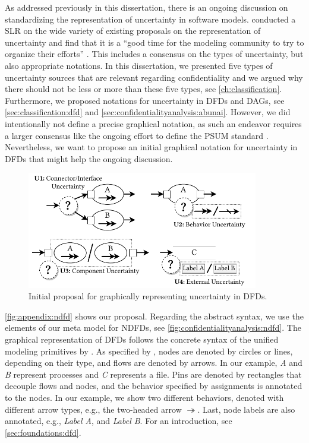 As addressed previously in this dissertation, there is an ongoing discussion on standardizing the representation of uncertainty in software models.
\textcite{troya_uncertainty_2021} conducted a \acf{SLR} on the wide variety of existing proposals on the representation of uncertainty and find that it is a \enquote{good time for the modeling community to try to organize their efforts} \cite{troya_uncertainty_2021}.
This includes a consensus on the types of uncertainty, but also appropriate notations.
In this dissertation, we presented five types of uncertainty sources that are relevant regarding confidentiality and we argued why there should not be less or more than these five types, see \autoref{ch:classification}.
Furthermore, we proposed notations for uncertainty in \acfp{DFD} and \acfp{DAG}, see \autoref{sec:classification:dfd} and \autoref{sec:confidentialityanalysis:abunai}.
However, we did intentionally not define a precise graphical notation, as such an endeavor requires a larger consensus like the ongoing effort to define the \acf{PSUM} standard \cite{PSUM}.
Nevertheless, we want to propose an initial graphical notation for uncertainty in \acp{DFD} that might help the ongoing discussion.

\begin{figure}
    \centering
    \includegraphics[width=0.9\textwidth]{figures/chapter12/graphicalndfd.pdf}
    \caption{Initial proposal for graphically representing uncertainty in \acfp*{DFD}.}
    \label{fig:appendix:ndfd}
\end{figure}

\autoref{fig:appendix:ndfd} shows our proposal.
Regarding the abstract syntax, we use the elements of our meta model for \acfp{NDFD}, see \autoref{fig:confidentialityanalysis:ndfd}.
The graphical representation of \acp{DFD} follows the concrete syntax of the unified modeling primitives by \textcite{seifermann_unified_2021}.
As specified by \textcite{demarco_structure_1979}, nodes are denoted by circles or lines, depending on their type, and flows are denoted by arrows.
In our example, \emph{A} and \emph{B} represent processes and \emph{C} represents a file.
Pins are denoted by rectangles that decouple flows and nodes, and the behavior specified by assignments is annotated to the nodes.
In our example, we show two different behaviors, denoted with different arrow types, e.g., the two-headed arrow $\twoheadrightarrow$.
Last, node labels are also annotated, e.g., \emph{Label A}, and \emph{Label B}.
For an introduction, see \autoref{sec:foundations:dfd}.

